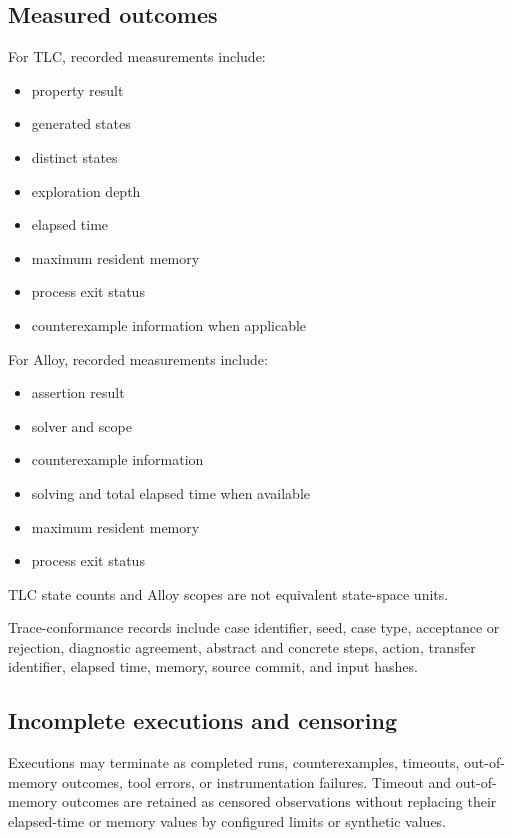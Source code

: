 \subsection{Measured outcomes}
\label{subsec:measured-outcomes}

For TLC, recorded measurements include:

\begin{itemize}
\item property result
\item generated states
\item distinct states
\item exploration depth
\item elapsed time
\item maximum resident memory
\item process exit status
\item counterexample information when applicable
\end{itemize}

For Alloy, recorded measurements include:

\begin{itemize}
\item assertion result
\item solver and scope
\item counterexample information
\item solving and total elapsed time when available
\item maximum resident memory
\item process exit status
\end{itemize}

TLC state counts and Alloy scopes are not equivalent state-space units.

Trace-conformance records include case identifier, seed, case type, acceptance
or rejection, diagnostic agreement, abstract and concrete steps, action,
transfer identifier, elapsed time, memory, source commit, and input hashes.

\subsection{Incomplete executions and censoring}
\label{subsec:censoring}

Executions may terminate as completed runs, counterexamples, timeouts,
out-of-memory outcomes, tool errors, or instrumentation failures. Timeout and
out-of-memory outcomes are retained as censored observations without replacing
their elapsed-time or memory values by configured limits or synthetic values.

